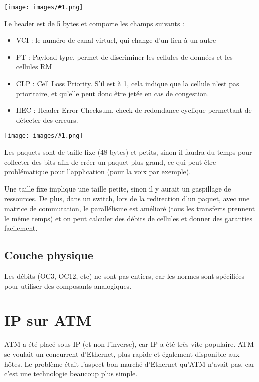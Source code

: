\documentclass[10pt,a4paper]{report}
\newcommand{\dessin}[1]{\begin{center}\texttt{[image: images/\#1.png]}\end{center}}
\begin{document}
		\dessin{12}
		
		Le header est de 5 bytes et comporte les champs suivants :
	
		\begin{itemize}
			\item VCI : le numéro de canal virtuel, qui change d'un lien à un autre 
			\item PT : Payload type, permet de discriminer les cellules de données et les cellules RM
			\item CLP : Cell Loss Priority. S'il est à 1, cela indique que la cellule n'est pas prioritaire, et qu'elle peut donc être jetée en cas de congestion.
			\item HEC : Header Error Checksum, check de redondance cyclique permettant de détecter des erreurs.
		\end{itemize}
		
		\dessin{11}
						
		Les paquets sont de taille fixe (48 bytes) et petits, sinon il faudra du temps pour collecter des bits afin de créer un paquet plus grand, ce qui peut être problématique pour l'application (pour la voix par exemple). 
	
		Une taille fixe implique une taille petite, sinon il y aurait un gaspillage de ressources. De plus, dans un switch, lors de la redirection d'un paquet, avec une matrice de commutation, le parallélisme est amélioré (tous les transferts prennent le même temps) et on peut calculer des débits de cellules et donner des garanties facilement.
	
		\subsection{Couche physique}
		
		
		Les débits (OC3, OC12, etc) ne sont pas entiers, car les normes sont spécifiées pour utiliser des composants analogiques.
	
	\section{IP sur ATM}
	
	ATM a été placé sous IP (et non l'inverse), car IP a été très vite populaire. ATM se voulait un concurrent d'Ethernet, plus rapide et également disponible aux hôtes. Le problème était l'aspect bon marché d'Ethernet qu'ATM n'avait pas, car c'est une technologie beaucoup plus simple.
	
\end{document}
